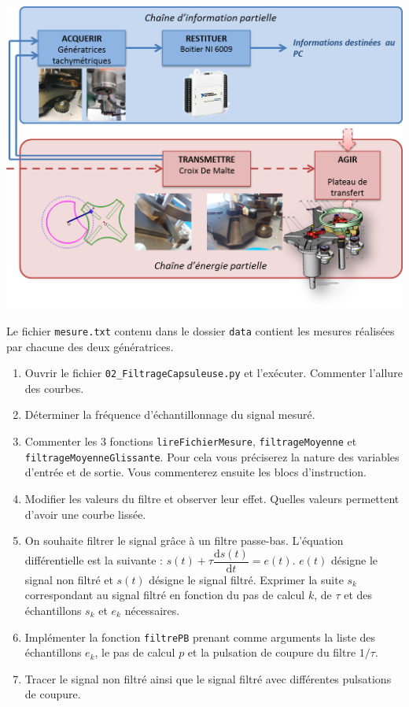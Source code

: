 \documentclass[10pt,fleqn]{article} %
\begin{document}
\begin{center}
\includegraphics[width=.7\linewidth]{images/CE_CI}
\end{center}
Le fichier \texttt{mesure.txt} contenu dans le dossier \texttt{data} contient les mesures réalisées par chacune des deux génératrices.


\begin{enumerate}
\item Ouvrir le fichier \texttt{02\_FiltrageCapsuleuse.py} et l'exécuter. Commenter l'allure des courbes.
\item Déterminer la fréquence d'échantillonnage du signal mesuré. 
\item Commenter les 3 fonctions \texttt{lireFichierMesure}, \texttt{filtrageMoyenne} et \texttt{filtrageMoyenneGlissante}. Pour cela vous préciserez la nature des variables d'entrée et de sortie. Vous commenterez ensuite les blocs d'instruction. 
\item Modifier les valeurs du filtre et observer leur effet. Quelles valeurs permettent d'avoir une courbe lissée. 
\item On souhaite filtrer le signal grâce à un filtre passe-bas. L'équation différentielle est la suivante : $s(t)+\tau \dfrac{\text{d} s(t)}{\text{d}t} = e(t)$. $e(t)$ désigne le signal non filtré et $s(t)$ désigne le signal filtré. Exprimer la suite $s_k$ correspondant au signal filtré en fonction du pas de calcul $k$, de $\tau$ et des échantillons $s_k$ et $e_k$ nécessaires. 
\item Implémenter la fonction \texttt{filtrePB} prenant comme arguments la liste des échantillons $e_k$, le pas de calcul $p$ et la pulsation de coupure du filtre $1/\tau$.
\item Tracer le signal non filtré ainsi que le signal filtré avec différentes pulsations de coupure.
\end{enumerate}
\end{document}
